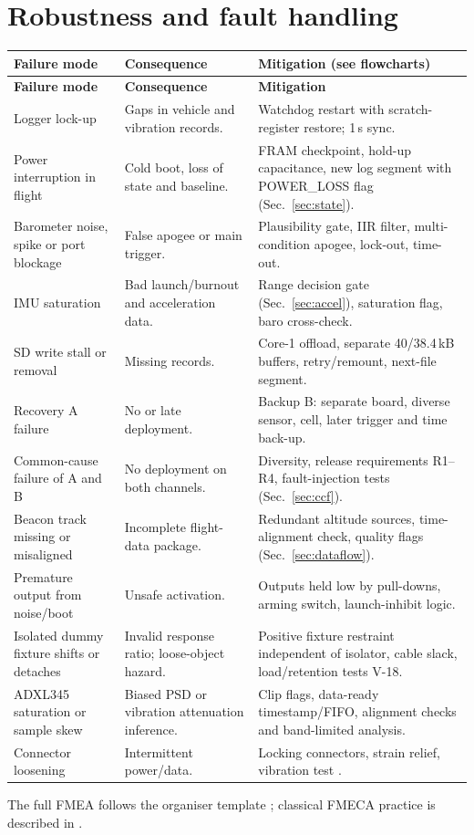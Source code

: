 \section{Robustness and fault handling}
\small
\begingroup
{}
\begin{longtable}{@{}L{34mm}L{50mm}L{62mm}@{}}
\toprule{}\textbf{Failure mode}&\textbf{Consequence}&\textbf{Mitigation (see flowcharts)}\\\midrule\endfirsthead
\toprule{}\textbf{Failure mode}&\textbf{Consequence}&\textbf{Mitigation}\\\midrule\endhead
\bottomrule\endlastfoot
Logger lock-up & Gaps in vehicle and vibration records. & Watchdog restart with scratch-register restore; 1\,s sync.\\
Power interruption in flight & Cold boot, loss of state and baseline. & FRAM checkpoint, hold-up capacitance, new log segment with POWER\_LOSS flag (Sec.~\ref{sec:state}).\\
Barometer noise, spike or port blockage & False apogee or main trigger. & Plausibility gate, IIR filter, multi-condition apogee, lock-out, time-out.\\
IMU saturation & Bad launch/burnout and acceleration data. & Range decision gate (Sec.~\ref{sec:accel}), saturation flag, baro cross-check.\\
SD write stall or removal & Missing records. & Core-1 offload, separate 40/38.4\,kB buffers, retry/remount, next-file segment.\\
Recovery A failure & No or late deployment. & Backup B: separate board, diverse sensor, cell, later trigger and time back-up.\\
Common-cause failure of A and B & No deployment on both channels. & Diversity, release requirements R1--R4, fault-injection tests (Sec.~\ref{sec:ccf}).\\
Beacon track missing or misaligned & Incomplete flight-data package. & Redundant altitude sources, time-alignment check, quality flags (Sec.~\ref{sec:dataflow}).\\
Premature output from noise/boot & Unsafe activation. & Outputs held low by pull-downs, arming switch, launch-inhibit logic.\\
Isolated dummy fixture shifts or detaches & Invalid response ratio; loose-object hazard. & Positive fixture restraint independent of isolator, cable slack, load/retention tests V-18.\\
ADXL345 saturation or sample skew & Biased PSD or vibration attenuation inference. & Clip flags, data-ready timestamp/FIFO, alignment checks and band-limited analysis.\\
Connector loosening & Intermittent power/data. & Locking connectors, strain relief, vibration test \cite{rtc2027app03}.\\
\end{longtable}
\endgroup %
\normalsize
The full FMEA follows the organiser template \cite{rtc2027app12}; classical FMECA practice is described in \cite{mil1629a}.

